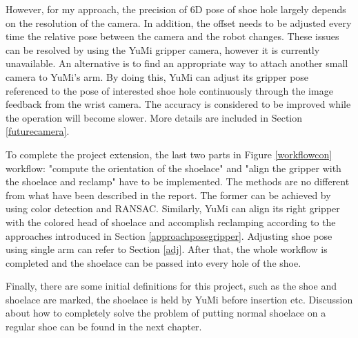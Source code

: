 However, for my approach, the precision of 6D pose of shoe hole largely depends on the resolution of the camera. In addition, the offset needs to be adjusted every time the relative pose between the camera and the robot changes. These issues can be resolved by using the YuMi gripper camera, however it is currently unavailable. An alternative is to find an appropriate way to attach another small camera to YuMi's arm. By doing this, YuMi can adjust its gripper pose referenced to the pose of interested shoe hole continuously through the image feedback from the wrist camera. The accuracy is considered to be improved while the operation will become slower. More details are included in Section \ref{futurecamera}.



To complete the project extension, the last two parts in Figure \ref{workflowcon} workflow: "compute the orientation of the shoelace" and "align the gripper with the shoelace and reclamp" have to be implemented. The methods are no different from what have been described in the report. The former can be achieved by using color detection and RANSAC. Similarly, YuMi can align its right gripper with the colored head of shoelace and accomplish reclamping according to the approaches introduced in Section \ref{approachposegripper}. Adjusting shoe pose using single arm can refer to Section \ref{adj}. After that, the whole workflow is completed and the shoelace can be passed into every hole of the shoe.

Finally, there are some initial definitions for this project, such as the shoe and shoelace are marked, the shoelace is held by YuMi before insertion etc. Discussion about how to completely solve the problem of putting normal shoelace on a regular shoe can be found in the next chapter. 


